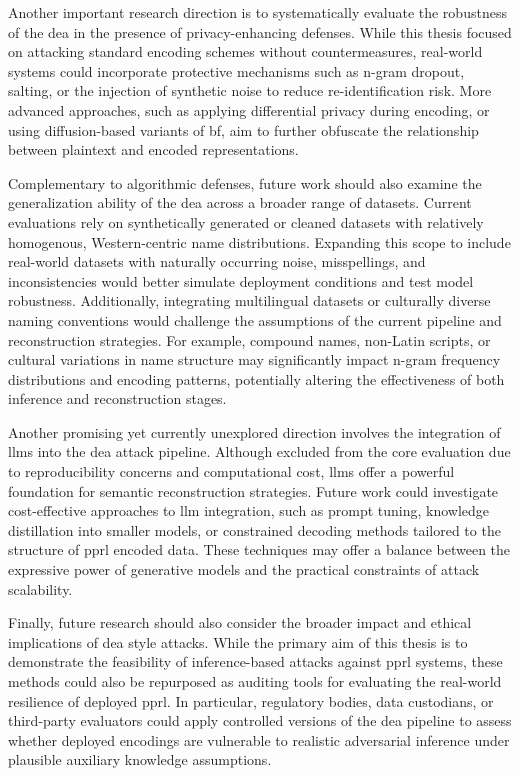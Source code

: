 Another important research direction is to systematically evaluate the robustness of the \ac{dea} in the presence of privacy-enhancing defenses.
While this thesis focused on attacking standard encoding schemes without countermeasures, real-world systems could incorporate protective mechanisms such as n-gram dropout, salting, or the injection of synthetic noise to reduce re-identification risk.
More advanced approaches, such as applying differential privacy during encoding, or using diffusion-based variants of \ac{bf}, aim to further obfuscate the relationship between plaintext and encoded representations.

Complementary to algorithmic defenses, future work should also examine the generalization ability of the \ac{dea} across a broader range of datasets.
Current evaluations rely on synthetically generated or cleaned datasets with relatively homogenous, Western-centric name distributions.
Expanding this scope to include real-world datasets with naturally occurring noise, misspellings, and inconsistencies would better simulate deployment conditions and test model robustness.
Additionally, integrating multilingual datasets or culturally diverse naming conventions would challenge the assumptions of the current pipeline and reconstruction strategies.
For example, compound names, non-Latin scripts, or cultural variations in name structure may significantly impact n-gram frequency distributions and encoding patterns, potentially altering the effectiveness of both inference and reconstruction stages.

Another promising yet currently unexplored direction involves the integration of \ac{llm}s into the \ac{dea} attack pipeline.
Although excluded from the core evaluation due to reproducibility concerns and computational cost, \ac{llm}s offer a powerful foundation for semantic reconstruction strategies.
Future work could investigate cost-effective approaches to \ac{llm} integration, such as prompt tuning, knowledge distillation into smaller models, or constrained decoding methods tailored to the structure of \ac{pprl} encoded data.
These techniques may offer a balance between the expressive power of generative models and the practical constraints of attack scalability.

Finally, future research should also consider the broader impact and ethical implications of \ac{dea} style attacks.
While the primary aim of this thesis is to demonstrate the feasibility of inference-based attacks against \ac{pprl} systems, these methods could also be repurposed as auditing tools for evaluating the real-world resilience of deployed \ac{pprl}.
In particular, regulatory bodies, data custodians, or third-party evaluators could apply controlled versions of the \ac{dea} pipeline to assess whether deployed encodings are vulnerable to realistic adversarial inference under plausible auxiliary knowledge assumptions.

